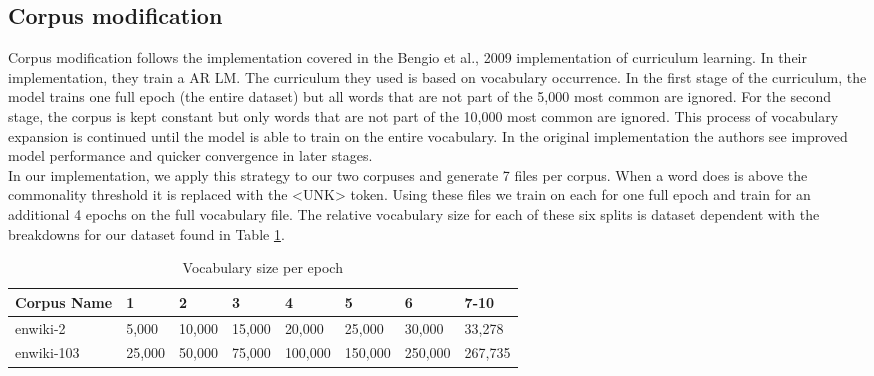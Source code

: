 \subsection{Corpus modification}
Corpus modification follows the implementation covered in the Bengio et al., 2009 \cite{Bengio2009CurriculumL} implementation of curriculum learning. In their implementation, they train a AR LM. The curriculum they used is based on vocabulary occurrence. In the first stage of the curriculum, the model trains one full epoch (the entire dataset) but all words that are not part of the 5,000 most common are ignored. For the second stage, the corpus is kept constant but only words that are not part of the 10,000 most common are ignored. This process of vocabulary expansion is continued until the model is able to train on the entire vocabulary. In the original implementation the authors see improved model performance and quicker convergence in later stages. \\
In our implementation, we apply this strategy to our two corpuses and generate 7 files per corpus. When a word does is above the commonality threshold it is replaced with the <UNK> token. Using these files we train on each for one full epoch and train for an additional 4 epochs on the full vocabulary file. The relative vocabulary size for each of these six splits is dataset dependent with the breakdowns for our dataset found in Table \ref{table:2}.
\begin{table}[h!]
\begin{center}
\begin{tabular}{|l|l|l|l|l|l|l|l|} \hline
\textbf{Corpus Name} & \textbf{1} & \textbf{2} & \textbf{3} & \textbf{4} & \textbf{5} & \textbf{6} & \textbf{7-10}  \\ \hline
enwiki-2 & 5,000 & 10,000 & 15,000 & 20,000 & 25,000 & 30,000 & 33,278 \\ \hline
enwiki-103 & 25,000 & 50,000 & 75,000 & 100,000 & 150,000  & 250,000 & 267,735\\ \hline
\end{tabular}
\caption{Vocabulary size per epoch}
\label{table:2}
\end{center}
\end{table}
